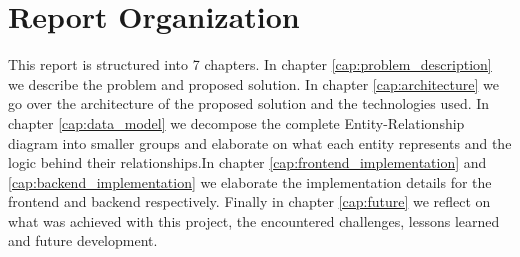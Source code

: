 \section{Report Organization}

This report is structured into 7 chapters. In chapter \ref{cap:problem_description} we describe the problem and proposed solution. In chapter \ref{cap:architecture} we go over the architecture of the proposed solution and the technologies used. In chapter \ref{cap:data_model} we decompose the complete Entity-Relationship diagram into smaller groups and elaborate on what each entity represents and the logic behind their relationships.In chapter \ref{cap:frontend_implementation} and \ref{cap:backend_implementation} we elaborate the implementation details for the frontend and backend respectively. Finally in chapter \ref{cap:future} we reflect on what was achieved with this project, the encountered challenges, lessons learned and future development.
%
%
%
%
%
%
%
%
%
%
%
